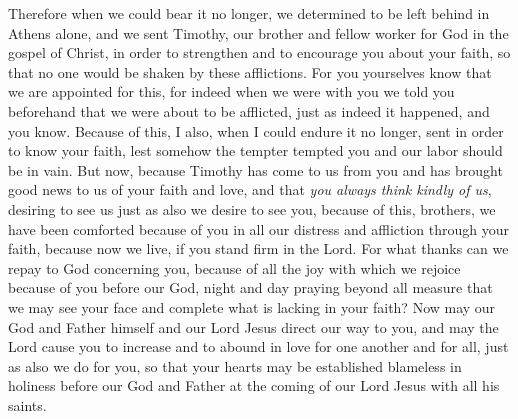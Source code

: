 \begin{biblechapter} %
 Therefore when we could bear it no longer, we determined to be left behind in Athens alone,
\verse and we sent Timothy, our brother and fellow worker for God in the gospel of Christ, in order to strengthen and to encourage you about your faith,
\verse so that no one would be shaken by these afflictions. For you yourselves know that we are appointed for this,
\verse for indeed when we were with you we told you beforehand that we were about to be afflicted, just as indeed it happened, and you know.
\verse Because of this, I also, when I could endure it no longer, sent in order to know your faith, lest somehow the tempter tempted you and our labor should be in vain.
 But now, because Timothy has come to us from you and has brought good news to us of your faith and love, and that \textit{you always think kindly of us}, desiring to see us just as also we desire to see you,
\verse because of this, brothers, we have been comforted because of you in all our distress and affliction through your faith,
\verse because now we live, if you stand firm in the Lord.
\verse For what thanks can we repay to God concerning you, because of all the joy with which we rejoice because of you before our God,
\verse night and day praying beyond all measure that we may see your face and complete what is lacking in your faith?
\verse Now may our God and Father himself and our Lord Jesus direct our way to you,
\verse and may the Lord cause you to increase and to abound in love for one another and for all, just as also we do for you,
\verse so that your hearts may be established blameless in holiness before our God and Father at the coming of our Lord Jesus with all his saints.
\end{biblechapter}

